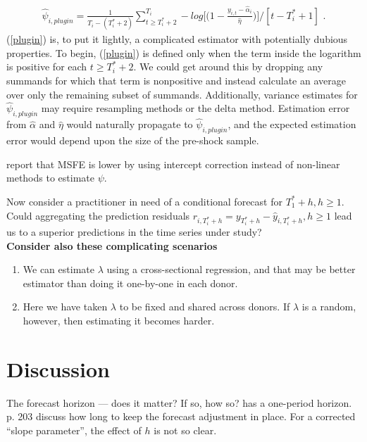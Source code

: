 \documentclass[11pt]{article}
\theoremstyle{definition}
\begin{document}
\begin{align}
\hat\psi_{i,plugin} = \frac{1}{T_{i}-(T_{i}^{*}+2)}\sum^{T_{i}}_{t\geq T_{i}^{*}+2}-log{\big[\big(1-\frac{y_{i,t}-\hat\alpha_{i}}{\hat\eta}\big)\big]} / [t-T_{i}^{*}+1]\text{ .}\label{plugin}
\end{align}
(\ref{plugin}) is, to put it lightly, a complicated estimator with potentially dubious properties.  To begin, (\ref{plugin}) is defined only when the term inside the logarithm is positive for each $t\geq T^{*}_{i}+2$.  We could get around this by dropping any summands for which that term is nonpositive and instead calculate an average over only the remaining subset of summands.  Additionally, variance estimates for $\hat\psi_{i,plugin}$ may require resampling methods or the delta method.  Estimation error from $\hat\alpha$ and $\hat\eta$ would naturally propagate to $\hat\psi_{i,plugin}$, and the expected estimation error would depend upon the size of the pre-shock sample.

\cite{castle2011forecasting} report that MSFE is lower by using intercept correction instead of non-linear methods to estimate $\psi$.

Now consider a practitioner in need of a conditional forecast for $T_{1}^{*}+h, h\geq 1$.  Could aggregating the prediction residuals $r_{i,T_{i}^{*}+h} = y_{T_{i}^{*}+h}-\hat y_{i, T_{i}^{*}+h}, h\geq 1$ lead us to a superior predictions in the time series under study?\\

\textbf{Consider also these complicating scenarios}
\begin{enumerate}
  \item We can estimate $\lambda$ using a cross-sectional regression, and that may be better estimator than doing it one-by-one in each donor.
  \item Here we have taken $\lambda$ to be fixed and shared across donors.  If $\lambda$ is a random, however, then estimating it becomes harder.
\end{enumerate}



\section{Discussion}

The forecast horizon --- does it matter?  If so, how so?  \cite{lin2021minimizing} has a one-period horizon.  \cite{clements1998forecasting}{p. 203} discuss how long to keep the forecast adjustment in place.  For a corrected ``slope parameter'', the effect of $h$ is not so clear.\\
\end{document}
